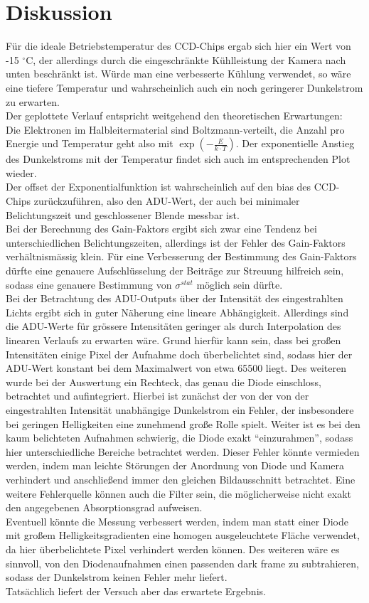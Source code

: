 \section{Diskussion}
Für die ideale Betriebstemperatur des CCD-Chips ergab sich hier ein Wert von -15 $^\circ$C, der allerdings durch die eingeschränkte Kühlleistung der Kamera nach unten beschränkt ist. Würde man eine verbesserte Kühlung verwendet, so wäre eine tiefere Temperatur und wahrscheinlich auch ein noch geringerer Dunkelstrom zu erwarten. \\
Der geplottete Verlauf entspricht weitgehend den theoretischen Erwartungen: \\
Die Elektronen im Halbleitermaterial sind Boltzmann-verteilt, die Anzahl pro Energie und Temperatur geht also mit $\exp(-\frac{E}{k \cdot T})$. Der exponentielle Anstieg des Dunkelstroms mit der Temperatur findet sich auch im entsprechenden Plot wieder. \\
Der offset der Exponentialfunktion ist wahrscheinlich auf den bias des CCD-Chips zurückzuführen, also den ADU-Wert, der auch bei minimaler Belichtungszeit und geschlossener Blende messbar ist. \\
Bei der Berechnung des Gain-Faktors ergibt sich zwar eine Tendenz bei unterschiedlichen Belichtungszeiten, allerdings ist der Fehler des Gain-Faktors verhältnismässig klein. Für eine Verbesserung der Bestimmung des Gain-Faktors dürfte eine genauere Aufschlüsselung der Beiträge zur Streuung hilfreich sein, sodass eine genauere Bestimmung von $\sigma^{stat}$ möglich sein dürfte. \\
Bei der Betrachtung des ADU-Outputs über der Intensität des eingestrahlten Lichts ergibt sich in guter Näherung eine lineare Abhängigkeit. Allerdings sind die ADU-Werte für grössere Intensitäten geringer als durch Interpolation des linearen Verlaufs zu erwarten wäre. Grund hierfür kann sein, dass bei großen Intensitäten einige Pixel der Aufnahme doch überbelichtet sind, sodass hier der ADU-Wert konstant bei dem Maximalwert von etwa 65500 liegt. Des weiteren wurde bei der Auswertung ein Rechteck, das genau die Diode einschloss, betrachtet und aufintegriert. Hierbei ist zunächst der von der von der eingestrahlten Intensität unabhängige Dunkelstrom ein Fehler, der insbesondere bei geringen Helligkeiten eine zunehmend große Rolle spielt. Weiter ist es bei den kaum belichteten Aufnahmen schwierig, die Diode exakt \enquote{einzurahmen}, sodass hier unterschiedliche Bereiche betrachtet werden. Dieser Fehler könnte vermieden werden, indem man leichte Störungen der Anordnung von Diode und Kamera verhindert und anschließend immer den gleichen Bildausschnitt betrachtet. Eine weitere Fehlerquelle können auch die Filter sein, die möglicherweise nicht exakt den angegebenen Absorptionsgrad aufweisen. \\
Eventuell könnte die Messung verbessert werden, indem man statt einer Diode mit großem Helligkeitsgradienten eine homogen ausgeleuchtete Fläche verwendet, da hier überbelichtete Pixel verhindert werden können. Des weiteren wäre es sinnvoll, von den Diodenaufnahmen einen passenden dark frame zu subtrahieren, sodass der Dunkelstrom keinen Fehler mehr liefert. \\
Tatsächlich liefert der Versuch aber das erwartete Ergebnis. 